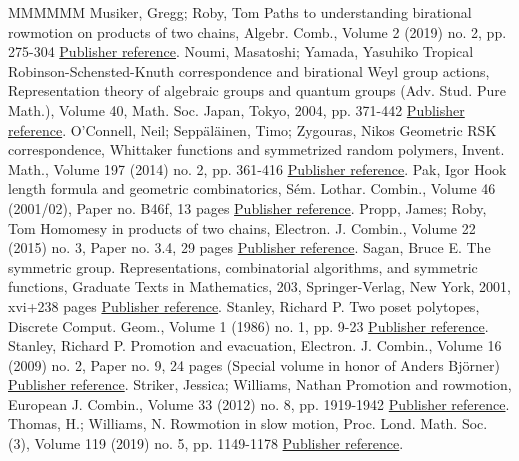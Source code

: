 \documentclass[11pt]{article}
\theoremstyle{definition}
\numberwithin{equation}{section}
\numberwithin{equation}{section}
\begin{document}
\begin{thebibliography}{MMMMMM}
 Musiker, Gregg; Roby, Tom Paths to understanding birational rowmotion on products of two chains, Algebr. Comb., Volume 2 (2019) no. 2, pp. 275-304 \href{https://alco.centre-mersenne.org/articles/10.5802/alco.385/#musikerroby}{Publisher reference}.
 Noumi, Masatoshi; Yamada, Yasuhiko Tropical Robinson-Schensted-Knuth correspondence and birational Weyl group actions, Representation theory of algebraic groups and quantum groups (Adv. Stud. Pure Math.), Volume 40, Math. Soc. Japan, Tokyo, 2004, pp. 371-442 \href{https://alco.centre-mersenne.org/articles/10.5802/alco.385/#noumiyamada}{Publisher reference}.
 O’Connell, Neil; Seppäläinen, Timo; Zygouras, Nikos Geometric RSK correspondence, Whittaker functions and symmetrized random polymers, Invent. Math., Volume 197 (2014) no. 2, pp. 361-416 \href{https://alco.centre-mersenne.org/articles/10.5802/alco.385/#osz}{Publisher reference}.
 Pak, Igor Hook length formula and geometric combinatorics, Sém. Lothar. Combin., Volume 46 (2001/02), Paper no. B46f, 13 pages \href{https://alco.centre-mersenne.org/articles/10.5802/alco.385/#pak}{Publisher reference}.
 Propp, James; Roby, Tom Homomesy in products of two chains, Electron. J. Combin., Volume 22 (2015) no. 3, Paper no. 3.4, 29 pages \href{https://alco.centre-mersenne.org/articles/10.5802/alco.385/#propproby}{Publisher reference}.
 Sagan, Bruce E. The symmetric group. Representations, combinatorial algorithms, and symmetric functions, Graduate Texts in Mathematics, 203, Springer-Verlag, New York, 2001, xvi+238 pages \href{https://alco.centre-mersenne.org/articles/10.5802/alco.385/#sagan}{Publisher reference}.
 Stanley, Richard P. Two poset polytopes, Discrete Comput. Geom., Volume 1 (1986) no. 1, pp. 9-23 \href{https://alco.centre-mersenne.org/articles/10.5802/alco.385/#stanley2}{Publisher reference}.
 Stanley, Richard P. Promotion and evacuation, Electron. J. Combin., Volume 16 (2009) no. 2, Paper no. 9, 24 pages (Special volume in honor of Anders Björner) \href{https://alco.centre-mersenne.org/articles/10.5802/alco.385/#stanley1}{Publisher reference}.
 Striker, Jessica; Williams, Nathan Promotion and rowmotion, European J. Combin., Volume 33 (2012) no. 8, pp. 1919-1942 \href{https://alco.centre-mersenne.org/articles/10.5802/alco.385/#strikerwilliams}{Publisher reference}.
 Thomas, H.; Williams, N. Rowmotion in slow motion, Proc. Lond. Math. Soc. (3), Volume 119 (2019) no. 5, pp. 1149-1178 \href{https://alco.centre-mersenne.org/articles/10.5802/alco.385/#thomaswilliams}{Publisher reference}.
\end{thebibliography}
\end{document}
